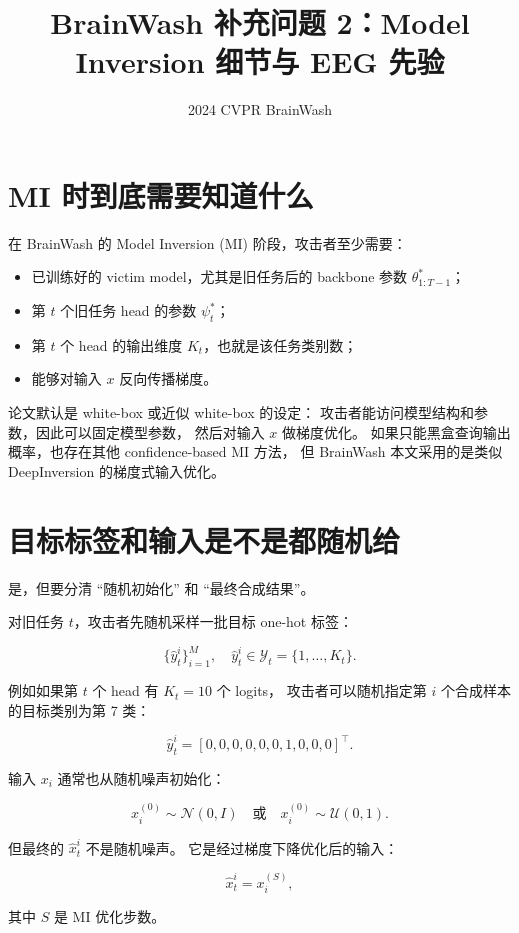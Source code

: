 \documentclass[11pt]{article}
\title{\textbf{BrainWash 补充问题 2：Model Inversion 细节与 EEG 先验}}
\author{}
\date{2024 CVPR BrainWash}
\begin{document}
\maketitle

\section{MI 时到底需要知道什么}

在 BrainWash 的 Model Inversion (MI) 阶段，攻击者至少需要：

\begin{itemize}
  \item 已训练好的 victim model，尤其是旧任务后的 backbone 参数
  \(\theta_{1:T-1}^{*}\)；
  \item 第 \(t\) 个旧任务 head 的参数 \(\psi_t^{*}\)；
  \item 第 \(t\) 个 head 的输出维度 \(K_t\)，也就是该任务类别数；
  \item 能够对输入 \(x\) 反向传播梯度。
\end{itemize}

论文默认是 white-box 或近似 white-box 的设定：
攻击者能访问模型结构和参数，因此可以固定模型参数，
然后对输入 \(x\) 做梯度优化。
如果只能黑盒查询输出概率，也存在其他 confidence-based MI 方法，
但 BrainWash 本文采用的是类似 DeepInversion 的梯度式输入优化。

\section{目标标签和输入是不是都随机给}

是，但要分清 ``随机初始化'' 和 ``最终合成结果''。

对旧任务 \(t\)，攻击者先随机采样一批目标 one-hot 标签：

\[
\{\hat{y}_t^i\}_{i=1}^{M},
\quad
\hat{y}_t^i\in\mathcal{Y}_t
=
\{1,\ldots,K_t\}.
\]

例如如果第 \(t\) 个 head 有 \(K_t=10\) 个 logits，
攻击者可以随机指定第 \(i\) 个合成样本的目标类别为第 7 类：

\[
\hat{y}_t^i
=
[0,0,0,0,0,0,1,0,0,0]^\top.
\]

输入 \(x_i\) 通常也从随机噪声初始化：

\[
x_i^{(0)}
\sim
\mathcal{N}(0,I)
\quad
\text{或}
\quad
x_i^{(0)}
\sim
\mathcal{U}(0,1).
\]

但最终的 \(\hat{x}_t^i\) 不是随机噪声。
它是经过梯度下降优化后的输入：

\[
\hat{x}_t^i
=
x_i^{(S)},
\]

其中 \(S\) 是 MI 优化步数。
\end{document}
